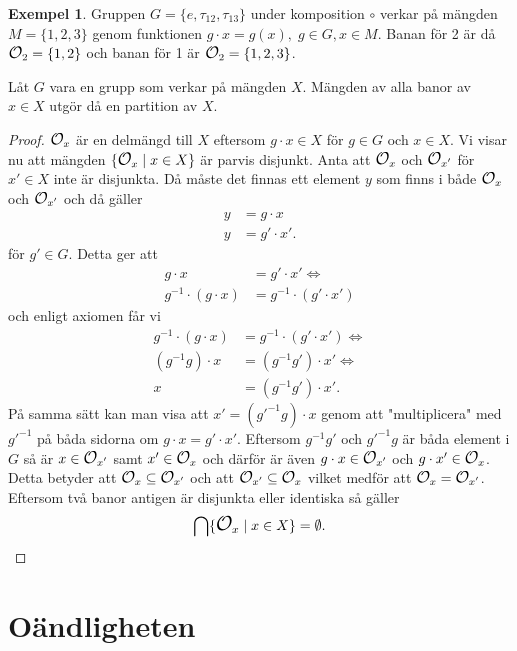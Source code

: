 \documentclass{article}
\newcommand{\orbit}[0]{\mathlarger{\mathlarger{\mathcal{O}}}}
\theoremstyle{definition}
\newtheorem{exmp}[thm]{Exempel}
\begin{document}
\begin{exmp}
  Gruppen $G = \{e, \tau_{12}, \tau_{13}\}$ under komposition $\circ$ verkar på 
  mängden $M = \{1, 2, 3\}$ genom funktionen $g \cdot x = g(x), \; g \in G, x \in M$. 
  Banan för 2 är då $\orbit_2 = \{1, 2\}$ och banan för 1 är $\orbit_2 = \{1, 2, 3\}$.
\end{exmp}

\begin{mytheo}{}{}
  Låt $G$ vara en grupp som verkar på mängden $X$. Mängden av alla banor av $x \in X$
  utgör då en partition av $X$. 
\end{mytheo}
\begin{proof}
  $\orbit_x$ är en delmängd till $X$ eftersom $g \cdot x \in X$ för $g \in G$ och $x \in X$.
  Vi visar nu att mängden $\{\orbit_x \; | \; x \in X\}$ är parvis disjunkt. 
  Anta att $\orbit_x$
  och $\orbit_{x'}$ för $x' \in X$ inte är disjunkta. Då måste det finnas 
  ett element $y$ som finns i både $\orbit_x$ och $\orbit_{x'}$ och då gäller 
  \begin{align*}
    y &= g \cdot x \\
    y &= g' \cdot x'.
  \end{align*}
  för $g' \in G.$ Detta ger att 
  \begin{align*}
    g \cdot x &= g' \cdot x' \iff \\
    g^{-1} \cdot (g \cdot x) &= g^{-1} \cdot (g' \cdot x')
  \end{align*}
  och enligt axiomen får vi 
  \begin{align*}
    g^{-1} \cdot (g \cdot x) &= g^{-1} \cdot (g' \cdot x') \iff \\
    (g^{-1} g) \cdot x &= (g^{-1} g') \cdot x' \iff \\
    x &= (g^{-1} g') \cdot x'.
  \end{align*} 
  På samma sätt kan man visa att $x' = (g'^{-1}g) \cdot x$ genom att 
  "multiplicera" med $g'^{-1}$ på båda sidorna om $g \cdot x = g' \cdot x'$. 
  Eftersom $g^{-1} g'$ och $g'^{-1}g$ är båda element i $G$ så är 
  $x \in \orbit_{x'}$ samt $x' \in \orbit_x$ och därför är även $g \cdot x \in \orbit_{x'}$
  och $g \cdot x' \in \orbit_{x}$. Detta betyder att $\orbit_x \subseteq \orbit_{x'}$ och att 
  $\orbit_{x'} \subseteq \orbit_x$ vilket medför att $\orbit_x = \orbit_{x'}$.
  Eftersom två banor antigen är disjunkta eller identiska så gäller 
  \[\bigcap \{\orbit_x \; | \; x \in X\} = \emptyset.\]
\end{proof}

\section{Oändligheten}
\end{document}
